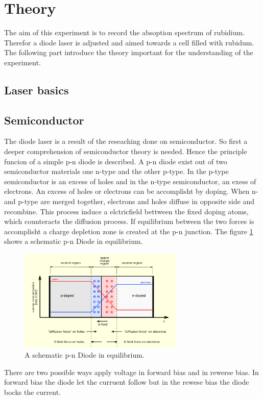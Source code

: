 \section{Theory}
\label{sec:theory}
The aim of this experiment is to record the absoption spectrum
of rubidium. Therefor a diode laser is adjusted and aimed towards a cell
filled with rubidum.
The following part introduce the theory
important for the understanding of the experiment.

\subsection{Laser basics}
\label{subsec:Laser}


\subsection{Semiconductor}
\label{subsec:Semiconductor}

The diode laser is a result of the reseaching done on semiconductor.
So first a deeper comprehension of semiconductor theory is needed.
Hence the principle funcion of a simple p-n diode is described.
A p-n diode exist out of two semiconductor materials one
n-type and the other p-type.
In the p-type semiconductor is an excess of holes
and in the n-type semiconductor, an exess of electrons.
An excess of holes or electrons can be accomplisht by doping.
When n- and p-type are merged together,
electrons and holes diffuse in opposite side and recombine.
This process induce a elctricfield bettween the fixed doping atoms, which
counteracts the diffusion process.
If equilibrium between the two forces is accomplisht
a charge depletion zone is created
at the p-n junction.
The figure \ref{fig:equi} shows
a schematic p-n Diode in equilibrium.

\begin{figure}
\centering
\includegraphics[width=0.7\textwidth]{equilibrium.png}
\caption{A schematic p-n Diode in equilibrium.
\cite{wiki_diode}}
\label{fig:equi}
\end{figure}
There are two possible ways apply voltage
in forward bias and
in rewerse bias.
In forward bias the diode let the curruent follow
but in the rewese bias the diode bocks the current.



